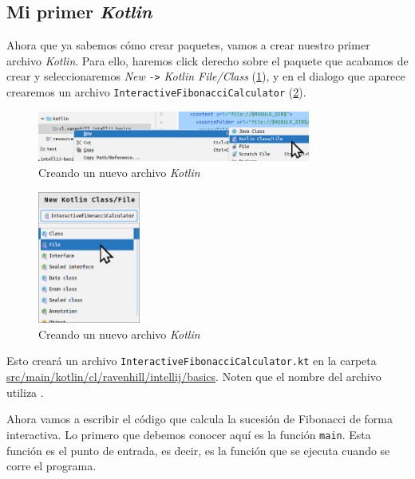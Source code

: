 
\subsection{Mi primer \textit{Kotlin}}
  Ahora que ya sabemos cómo crear paquetes, vamos a crear nuestro primer archivo \textit{Kotlin}.
  Para ello, haremos click derecho sobre el paquete que acabamos de crear y seleccionaremos
  \textit{New} \texttt{->} \textit{Kotlin File/Class} (\cref{fig:idea64_new_kotlin_file}), y en
  el dialogo que aparece crearemos un archivo \texttt{InteractiveFibonacciCalculator} 
  (\cref{fig:idea64_new_kotlin_file_dialog}).

  \begin{figure}[ht!]
    \centering
    \includegraphics[width=0.8\textwidth]{img/Por_algo_se_empieza/idea64_new_kotlin_file.png}
    \caption{Creando un nuevo archivo \textit{Kotlin}}
    \label{fig:idea64_new_kotlin_file}
  \end{figure}

  \begin{figure}[H]
    \centering
    \includegraphics[width=0.3\textwidth]{img/Por_algo_se_empieza/idea64_new_kotlin_file_dialog.png}
    \caption{Creando un nuevo archivo \textit{Kotlin}}
    \label{fig:idea64_new_kotlin_file_dialog}
  \end{figure}

  Esto creará un archivo \texttt{InteractiveFibonacciCalculator.kt} en la carpeta
  \url{src/main/kotlin/cl/ravenhill/intellij/basics}.
  Noten que el nombre del archivo utiliza .\autocite{WhatPascalCase}

  Ahora vamos a escribir el código que calcula la sucesión de Fibonacci de forma interactiva.
  Lo primero que debemos conocer aquí es la función \texttt{main}.
  Esta función es el punto de entrada, es decir, es la función que se ejecuta cuando se corre el
  programa.

